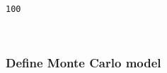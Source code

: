 \documentclass[11pt]{article}
\begin{document}
    \begin{center}
    \end{center}
    { \hspace*{\fill} \\}
    
    \begin{Verbatim}[commandchars=\\\{\}]
100

    \end{Verbatim}

    \begin{center}
    \end{center}
    { \hspace*{\fill} \\}
    
    \subsubsection{Define Monte Carlo model}\label{define-monte-carlo-model}
\end{document}
